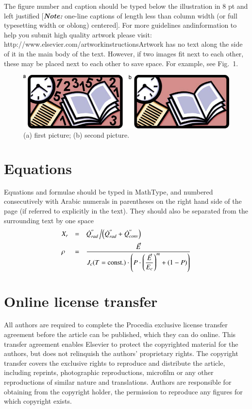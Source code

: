 \documentclass[3p,times,procedia]{elsarticle}
\begin{document}
The figure number and caption should be typed below the illustration in 8 pt and left justified [{\bfseries\itshape Note:} one-line captions of length less than column width (or full typesetting width or oblong) centered]. For more guidelines and\break information to help you submit high quality artwork please visit: http://www.elsevier.com/artworkinstructions\break Artwork has no text along the side of it in the main body of the text. However, if two images fit next to each other, these may be placed next to each other to save space. For example, see Fig.~1.
\begin{figure}[t]\vspace*{4pt}
\centerline{\includegraphics{gr1}}
\caption{(a) first picture; (b) second picture.}
\end{figure}


\section{Equations}
Equations and formulae should be typed in MathType, and numbered consecutively with Arabic numerals in parentheses on the right hand side of the page (if referred to explicitly in the text). They should also be separated from the surrounding text by one space
\begin{equation}
\begin{array}{lcl}
\displaystyle X_r &=& \displaystyle\dot{Q}^{''}_{rad}\left/\left(\dot{Q}^{''}_{rad} + \dot{Q}^{''}_{conv}\right)\right.\\[6pt]
\displaystyle \rho &=& \displaystyle\frac{\vec{E}}{J_c(T={\rm const.})\cdot\left(P\cdot\left(\displaystyle\frac{\vec{E}}{E_c}\right)^m+(1-P)\right)}
\end{array}
\end{equation}


\section{Online license transfer}
All authors are required to complete the Procedia exclusive license transfer agreement before the article can be published, which they can do online. This transfer agreement enables Elsevier to protect the copyrighted material for the authors, but does not relinquish the authors' proprietary rights. The copyright transfer covers the exclusive rights to reproduce and distribute the article, including reprints, photographic reproductions, microfilm or any other reproductions of similar nature and translations. Authors are responsible for obtaining from the copyright holder, the permission to reproduce any figures for which copyright exists.
\end{document}
